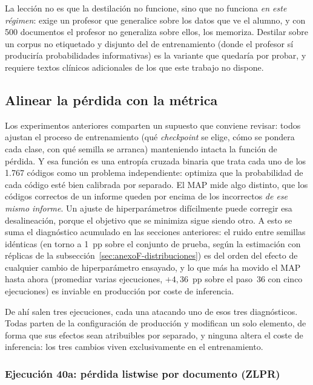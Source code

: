 La lección no es que la destilación no funcione, sino que no funciona \emph{en este régimen}: exige un profesor que generalice sobre los datos que ve el alumno, y con 500 documentos el profesor no generaliza sobre ellos, los memoriza. Destilar sobre un corpus no etiquetado y disjunto del de entrenamiento (donde el profesor sí produciría probabilidades informativas) es la variante que quedaría por probar, y requiere textos clínicos adicionales de los que este trabajo no dispone.

\subsection{Alinear la pérdida con la métrica}
\label{sec:anexoF-alineacion}

Los experimentos anteriores comparten un supuesto que conviene revisar: todos ajustan el proceso de entrenamiento (qué \emph{checkpoint} se elige, cómo se pondera cada clase, con qué semilla se arranca) manteniendo intacta la función de pérdida. Y esa función es una entropía cruzada binaria que trata cada uno de los 1.767 códigos como un problema independiente: optimiza que la probabilidad de cada código esté bien calibrada por separado. El MAP mide algo distinto, que los códigos correctos de un informe queden por encima de los incorrectos \emph{de ese mismo informe}. Un ajuste de hiperparámetros difícilmente puede corregir esa desalineación, porque el objetivo que se minimiza sigue siendo otro. A esto se suma el diagnóstico acumulado en las secciones anteriores: el ruido entre semillas idénticas (en torno a 1~pp sobre el conjunto de prueba, según la estimación con réplicas de la subsección~\ref{sec:anexoF-distribuciones}) es del orden del efecto de cualquier cambio de hiperparámetro ensayado, y lo que más ha movido el MAP hasta ahora (promediar varias ejecuciones, $+4{,}36$~pp sobre el paso~36 con cinco ejecuciones) es inviable en producción por coste de inferencia.

De ahí salen tres ejecuciones, cada una atacando uno de esos tres diagnósticos. Todas parten de la configuración de producción y modifican un solo elemento, de forma que sus efectos sean atribuibles por separado, y ninguna altera el coste de inferencia: los tres cambios viven exclusivamente en el entrenamiento.

\subsubsection*{Ejecución 40a: pérdida listwise por documento (ZLPR)}

